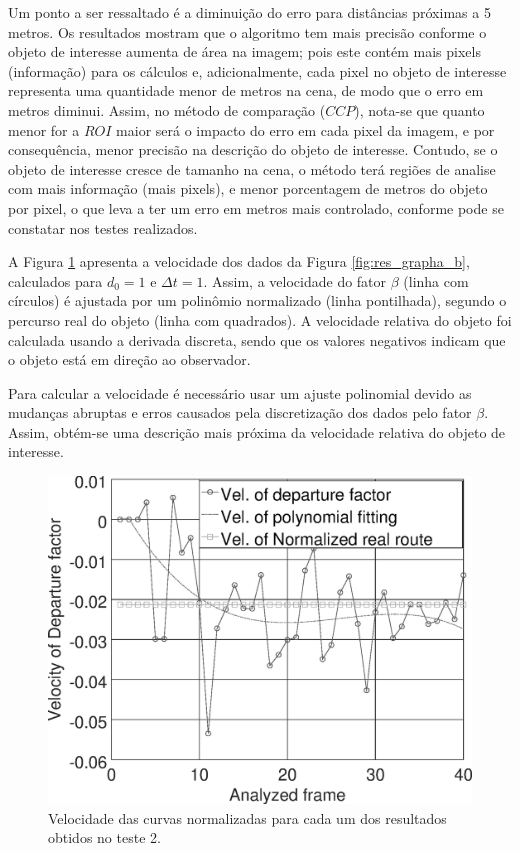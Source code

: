 Um ponto a ser ressaltado é a diminuição do erro para distâncias próximas a 5 metros.  
Os resultados mostram que o algoritmo tem mais precisão conforme o objeto de interesse 
aumenta de área na imagem; pois este contém mais pixels (informação)
para os cálculos e, adicionalmente, cada pixel no objeto de interesse 
representa uma quantidade menor de metros na cena, de modo que
o erro em metros diminui.
Assim, no método de comparação ($CCP$), nota-se que quanto menor for a $ROI$ 
maior será o impacto do erro em cada pixel da imagem, 
e por consequência, menor precisão na descrição do objeto de interesse. 
Contudo, se o objeto de interesse cresce de tamanho na cena,
o método terá regiões de analise com mais informação (mais pixels), e menor porcentagem de metros do objeto por pixel,
o que leva a ter um erro em metros mais controlado, conforme pode se constatar nos testes realizados. 

A Figura \ref{fig:res_grapha_bv} apresenta a velocidade dos dados da 
Figura \ref{fig:res_grapha_b}, calculados para $d_0=1$ e $\Delta t=1$.
Assim, a velocidade do fator $\beta$ (linha com círculos) é ajustada por um polinômio
normalizado (linha pontilhada), segundo o percurso real do objeto (linha com quadrados).
A velocidade relativa do objeto foi calculada usando a derivada
discreta, sendo que os valores negativos indicam que o objeto está
em direção ao observador.

Para calcular a velocidade é necessário usar um ajuste polinomial devido 
as mudanças abruptas e erros causados pela discretização dos dados pelo fator $\beta$.
Assim, obtém-se uma descrição mais próxima da velocidade relativa do 
objeto de interesse.

\begin{figure}[H]
\includegraphics[width=\columnwidth]{images/graphvelocity.eps}
\caption{Velocidade das curvas normalizadas para cada um dos resultados obtidos no teste 2.}
\label{fig:res_grapha_bv}
\end{figure}
